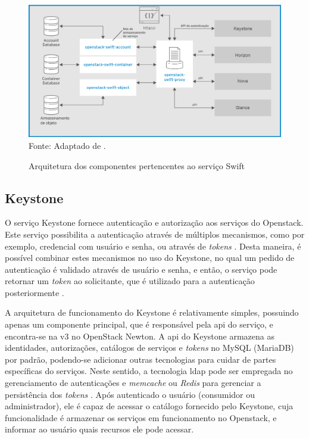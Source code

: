 \begin{figure}[!htb]
	\centering
	\caption{Arquitetura dos componentes pertencentes ao serviço Swift}
    \vspace{-0.3cm}
	\includegraphics[width=.8\textwidth]{img/swift_arquitetura.png}
	\label{fig:swift_components}\\
	Fonte: Adaptado de \cite{redhat:components}.
\end{figure}

\subsection{Keystone}

O serviço Keystone fornece autenticação e autorização aos serviços do Openstack. 
%
Este serviço possibilita a autenticação através de múltiplos mecanismos, como por exemplo, credencial com usuário e senha, ou através de \textit{tokens} \cite{redhat:components}.
%
Desta maneira, é possível combinar estes mecanismos no uso do Keystone, no qual um pedido de autenticação é validado através de usuário e senha, e então, o serviço pode retornar um \textit{token} ao solicitante, que é utilizado para a autenticação posteriormente \cite{openstack:keystone}.

A arquitetura de funcionamento do Keystone é relativamente simples, possuindo apenas um componente principal, que é responsável pela \ac{api} do serviço, e encontra-se na v3 no OpenStack Newton.
%
A \ac{api} do Keystone armazena as identidades, autorizações, catálogos de serviços e \textit{tokens} no MySQL (MariaDB) por padrão, podendo-se adicionar outras tecnologias para cuidar de partes específicas do serviços. 
%
Neste sentido, a tecnologia \ac{ldap} pode ser empregada no gerenciamento de autenticações e \textit{memcache} ou \textit{Redis} para gerenciar a persistência dos \textit{tokens} \cite{redhat:components}.
%
Após autenticado o usuário (consumidor ou administrador), ele é capaz de acessar o catálogo fornecido pelo Keystone, cuja funcionalidade é armazenar os serviços em funcionamento no Openstack, e informar ao usuário quais recursos ele pode acessar.


